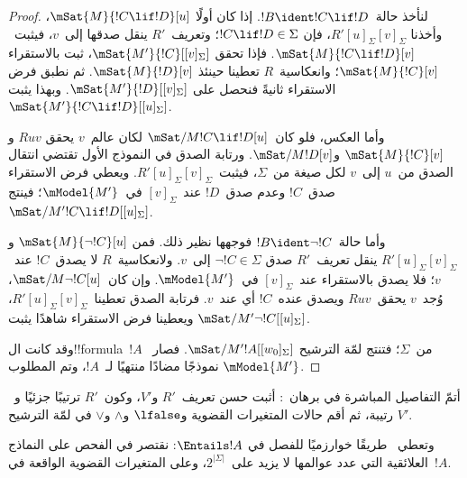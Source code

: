 \documentclass[../../../include/open-logic-section]{subfiles}
\begin{document}
\begin{proof}
  لنأخذ حالة~$!B\ident !C\lif !D$. إذا كان أولًا
  $\mSat{M}{!C\lif !D}[u]$، وأخذنا
  $R'{[u]_\Sigma}{[v]_\Sigma}$، فإن
  $!C\lif !D\in\Sigma$؛ وتعريف~$R'$ ينقل صدقها إلى~$v$،
  فيثبت~$\mSat{M}{!C\lif !D}[v]$. فإذا تحقق
  $\mSat{M'}{!C}[{[v]_\Sigma}]$، ثبت بالاستقراء
  $\mSat{M}{!C}[v]$؛ وانعكاسية~$R$ تعطينا حينئذ
  $\mSat{M}{!D}[v]$. ثم نطبق فرض الاستقراء ثانيةً فنحصل على
  $\mSat{M'}{!D}[{[v]_\Sigma}]$. وبهذا يثبت
  $\mSat{M'}{!C\lif !D}[{[u]_\Sigma}]$.

  وأما العكس، فلو كان~$\mSat/{M}{!C\lif !D}[u]$ لكان عالم~$v$ يحقق
  $Ruv$ و$\mSat{M}{!C}[v]$ و$\mSat/{M}{!D}[v]$. ورتابة الصدق في
  النموذج الأول تقتضي انتقال الصدق من~$u$ إلى~$v$ لكل صيغة من~$\Sigma$،
  فيثبت~$R'{[u]_\Sigma}{[v]_\Sigma}$. ويعطي فرض الاستقراء صدق~$!C$
  وعدم صدق~$!D$ عند~$[v]_\Sigma$ في~$\mModel{M'}$؛ فينتج
  $\mSat/{M'}{!C\lif !D}[{[u]_\Sigma}]$.

  وأما حالة~$!B\ident\lnot !C$ فوجهها نظير ذلك. فمن
  $\mSat{M}{\lnot !C}[u]$ و
  $R'{[u]_\Sigma}{[v]_\Sigma}$ ينقل تعريف~$R'$ صدق
  $\lnot !C\in\Sigma$ إلى~$v$. ولانعكاسية~$R$ لا يصدق~$!C$ عند~$v$؛
  فلا يصدق بالاستقراء عند~$[v]_\Sigma$ في~$\mModel{M'}$. وإن
  كان~$\mSat/{M}{\lnot !C}[u]$، وُجد~$v$ يحقق~$Ruv$ ويصدق عنده~$!C$
  أي عند~$v$. فرتابة الصدق تعطينا~$R'{[u]_\Sigma}{[v]_\Sigma}$،
  ويعطينا فرض الاستقراء شاهدًا يثبت
  $\mSat/{M'}{\lnot !C}[{[u]_\Sigma}]$.

  وقد كانت ال!!{formula}~$!A$ من~$\Sigma$؛ فتنتج لمّة الترشيح
  $\mSat/{M'}{!A}[{[w_0]_\Sigma}]$. فصار~$\mModel{M'}$ نموذجًا
  مضادًا منتهيًا لـ~$!A$، وتم المطلوب.
\end{proof}

\begin{prob}
أتمّ التفاصيل المباشرة في برهان~:
أثبت حسن تعريف~$R'$ و$V'$، وكون~$R'$ ترتيبًا جزئيًا و~$V'$
رتيبة، ثم أقم حالات المتغيرات القضوية و$\lfalse$ و$\land$ و$\lor$ في
لمّة الترشيح.
\end{prob}

وتعطي~ طريقًا خوارزميًا للفصل في
$\Entails !A$: نقتصر في الفحص على النماذج العلائقية التي عدد عوالمها
لا يزيد على~$2^{|\Sigma|}$، وعلى المتغيرات القضوية الواقعة
في~$!A$.
\end{document}
